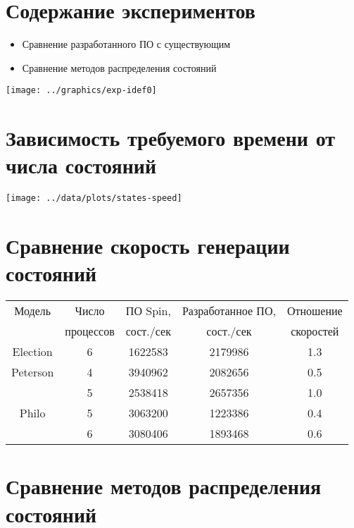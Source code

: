\documentclass[12pt]{article}
\begin{document}
\section{Содержание экспериментов}
\label{sec:experim}

\begin{itemize}
\item Сравнение разработанного ПО с существующим
\item Сравнение методов распределения состояний
\end{itemize}

\begin{center}
  \texttt{[image: ../graphics/exp-idef0]}
\end{center}

\section{Зависимость требуемого времени от числа состояний}
\label{sec:states-time}

\begin{center}
  \texttt{[image: ../data/plots/states-speed]}
\end{center}

\section{Сравнение скорость генерации состояний}
\label{sec:stategen-speed}

\begin{tabular}{ccccc}
  \hline
  Модель & Число     & ПО Spin,   & Разработанное ПО, & Отношение \\
  & процессов & сост./сек &  сост./сек         & скоростей \\
  \hline
  Election & 6 & 1622583 & 2179986 & 1.3 \\
  Peterson & 4 & 3940962 & 2082656 & 0.5 \\
   & 5 & 2538418 & 2657356 & 1.0 \\
  Philo & 5 & 3063200 & 1223386 & 0.4 \\
   & 6 & 3080406 & 1893468 & 0.6 \\
  \hline
\end{tabular}

\section{Сравнение методов распределения состояний}
\label{sec:partition-cmp}
\end{document}
